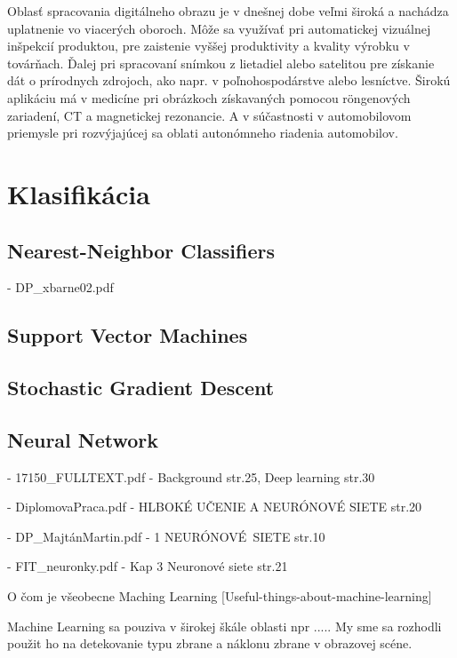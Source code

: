 Oblasť spracovania digitálneho obrazu je v dnešnej dobe veľmi široká a nachádza uplatnenie vo viacerých oboroch.
Môže sa využívať pri automatickej vizuálnej inšpekcií produktou, pre zaistenie vyššej produktivity a kvality výrobku v továrňach.
Ďalej pri spracovaní snímkou z lietadiel alebo satelitou pre získanie dát o prírodnych zdrojoch, ako napr. v poľnohospodárstve alebo lesníctve.
Širokú aplikáciu má v medicíne pri obrázkoch získavaných pomocou röngenových zariadení, CT a magnetickej rezonancie\cite{book:ImageProcessingApplication}.
A v súčastnosti v automobilovom priemysle pri rozvýjajúcej sa oblati autonómneho riadenia automobilov.

\section{Klasifikácia}

\subsection{Nearest-Neighbor Classifiers}
- DP\_xbarne02.pdf

\subsection{Support Vector Machines}

\subsection{Stochastic Gradient Descent}

\subsection{Neural Network}
- 17150\_FULLTEXT.pdf - Background str.25, Deep learning str.30

- DiplomovaPraca.pdf - HLBOKÉ UČENIE A NEURÓNOVÉ SIETE str.20

- DP\_MajtánMartin.pdf - 1 NEURÓNOVÉ\ SIETE str.10

- FIT\_neuronky.pdf - Kap 3 Neuronové siete str.21

O čom je všeobecne Maching Learning
[Useful-things-about-machine-learning]

Machine Learning sa pouziva v širokej škále oblasti npr .....
My sme sa rozhodli použit ho na detekovanie typu zbrane a náklonu zbrane v obrazovej scéne.




